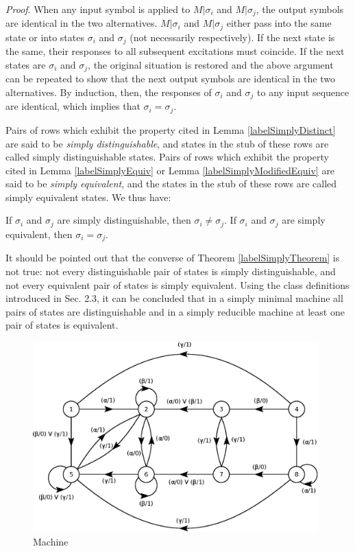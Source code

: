 \documentclass[a4paper]{report}
\begin{document}
    \emph{Proof}. When any input symbol is applied to $M|\sigma_i$ and $M|\sigma_j$, the output symbols are identical in the two alternatives. $M|\sigma_i$ and $M|\sigma_j$ either pass into the same state or into states $\sigma_i$ and $\sigma_j$ (not necessarily respectively). If the next state is the same, their responses to all subsequent excitations must coincide. If the next states are $\sigma_i$ and $\sigma_j$, the original situation is restored and the above argument can be repeated to show that the next output symbols are identical in the two alternatives. By induction, then, the responses of $\sigma_i$ and $\sigma_j$ to any input sequence are identical, which implies that $\sigma_i = \sigma_j$.

    Pairs of rows which exhibit the property cited in Lemma \ref{labelSimplyDistinct} are said to be \emph{simply distinguishable}, and states in the stub of these rows are called simply distinguishable states. Pairs of rows which exhibit the property cited in Lemma \ref{labelSimplyEquiv} or Lemma \ref{labelSimplyModifiedEquiv} are said to be \emph{simply equivalent}, and the states in the stub of these rows are called simply equivalent states.
    We thus have:

    \theorem \label{labelSimplyTheorem} If $\sigma_i$ and $\sigma_j$ are simply distinguishable, then $\sigma_i \neq \sigma_j $. If $\sigma_i$ and $\sigma_j$ are simply equivalent, then $\sigma_i = \sigma_j $.

    It should be pointed out that the converse of Theorem \ref{labelSimplyTheorem} is not true: not every distinguishable pair of states is simply distinguishable, and not every equivalent pair of states is simply equivalent. Using the class definitions introduced in Sec. 2.3, it can be concluded that in a simply minimal machine all pairs of states are distinguishable and in a simply reducible machine at least one pair of states is equivalent.

    \incSampleMachine
    \begin{figure}[!h]
        \centering
        \includegraphics[width=312pt,clip]{images/eps/machineA6}
        \caption{Machine \sampleMachine}
        \label{fig:machineA6}
    \end{figure}
\end{document}
